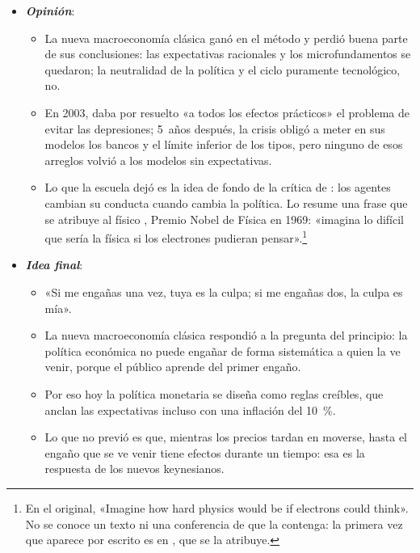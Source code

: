 \documentclass[11pt]{article}
\begin{document}
\begin{itemize}
\begin{itemize}
  \item En términos de \textcite{Lakatos1970Falsification}, la nueva macroeconomía clásica es un programa de investigación progresivo: su núcleo se ha mantenido y su cinturón protector ha pasado de las islas al ciclo real y de este a los EGDE con fricciones.
  \end{itemize}
\item \textbf{\emph{Opinión}}:
  \begin{itemize}
  \item La nueva macroeconomía clásica ganó en el método y perdió buena parte de sus conclusiones: las expectativas racionales y los microfundamentos se quedaron; la neutralidad de la política y el ciclo puramente tecnológico, no.

  \item En 2003,  daba por resuelto «a todos los efectos prácticos» el problema de evitar las depresiones\nocite{Lucas2003}; 5~años después, la crisis obligó a meter en sus modelos los bancos y el límite inferior de los tipos, pero ninguno de esos arreglos volvió a los modelos sin expectativas.

  \item Lo que la escuela dejó es la idea de fondo de la crítica de : los agentes cambian su conducta cuando cambia la política. Lo resume una frase que se atribuye al físico , Premio Nobel de Física en 1969: «imagina lo difícil que sería la física si los electrones pudieran pensar».\footnote{En el original, «Imagine how hard physics would be if electrons could think». No se conoce un texto ni una conferencia de  que la contenga: la primera vez que aparece por escrito es en \textcite{Page1999Computational}, que se la atribuye.}
  \end{itemize}
\item \textbf{\emph{Idea final}}:
  \begin{itemize}
  \item «Si me engañas una vez, tuya es la culpa; si me engañas dos, la culpa es mía».

  \item La nueva macroeconomía clásica respondió a la pregunta del principio: la política económica no puede engañar de forma sistemática a quien la ve venir, porque el público aprende del primer engaño.

  \item Por eso hoy la política monetaria se diseña como reglas creíbles, que anclan las expectativas incluso con una inflación del 10~\%.

  \item Lo que no previó es que, mientras los precios tardan en moverse, hasta el engaño que se ve venir tiene efectos durante un tiempo: esa es la respuesta de los nuevos keynesianos.
  \end{itemize}
\end{itemize}
\end{document}
